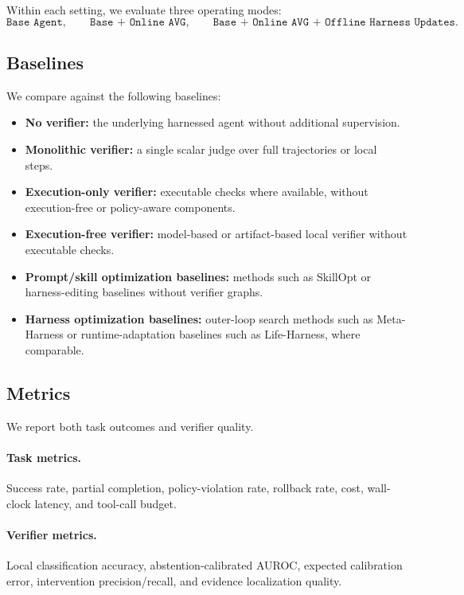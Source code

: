 \documentclass{article} %
\begin{document}
Within each setting, we evaluate three operating modes:
\begin{equation}
    \texttt{Base Agent}, \qquad
    \texttt{Base + Online AVG}, \qquad
    \texttt{Base + Online AVG + Offline Harness Updates}.
\end{equation}

\subsection{Baselines}
\label{subsec:baselines}

We compare against the following baselines:
\begin{itemize}[leftmargin=1.2em]
     \item \textbf{No verifier:} the underlying harnessed agent without additional supervision.
    \item \textbf{Monolithic verifier:} a single scalar judge over full trajectories or local steps.
    \item \textbf{Execution-only verifier:} executable checks where available, without execution-free or policy-aware components.
    \item \textbf{Execution-free verifier:} model-based or artifact-based local verifier without executable checks.
    \item \textbf{Prompt/skill optimization baselines:} methods such as SkillOpt or harness-editing baselines without verifier graphs.
    \item \textbf{Harness optimization baselines:} outer-loop search methods such as Meta-Harness or runtime-adaptation baselines such as Life-Harness, where comparable.
\end{itemize}

\subsection{Metrics}
\label{subsec:metrics}

We report both task outcomes and verifier quality.

\paragraph{Task metrics.}
Success rate, partial completion, policy-violation rate, rollback rate, cost, wall-clock latency, and tool-call budget.

\paragraph{Verifier metrics.}
Local classification accuracy, abstention-calibrated AUROC, expected calibration error, intervention precision/recall, and evidence localization quality.
\end{document}
